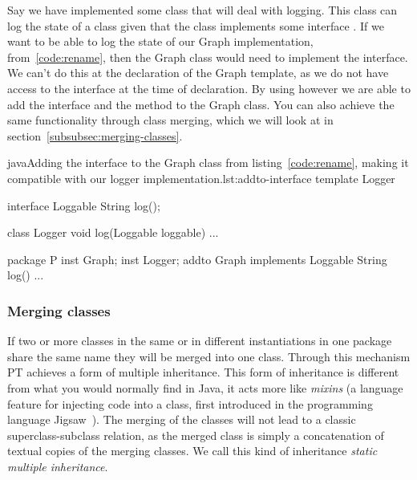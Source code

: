 Say we have implemented some class that will deal with logging.
This class can log the state of a class given that the class implements some interface .
If we want to be able to log the state of our Graph implementation, from~\vref{code:rename}, then the Graph class would need to implement the  interface.
We can't do this at the declaration of the Graph template, as we do not have access to the interface at the time of declaration.
By using  however we are able to add the  interface and the  method to the Graph class.
You can also achieve the same functionality through class merging, which we will look at in section~\vref{subsubsec:merging-classes}.

\begin{code}{java}{Adding the  interface to the Graph class from listing~\vref{code:rename}, making it compatible with our logger implementation.}{lst:addto-interface}
    template Logger {
        interface Loggable {
            String log();
        }

        class Logger {
            void log(Loggable loggable) {
                ...
            }
        }
    }

    package P {
        inst Graph;
        inst Logger;
        addto Graph implements Loggable {
            String log() {
                ...
            }
        }
    }
\end{code}



\subsubsection{Merging classes}\label{subsubsec:merging-classes}

If two or more classes in the same or in different instantiations in one package share the same name they will be merged into one class.
Through this mechanism PT achieves a form of multiple inheritance.
This form of inheritance is different from what you would normally find in Java, it acts more like \textit{mixins} (a language feature for injecting code into a class, first introduced in the programming language Jigsaw~\cite{jigsaw}).
The merging of the classes will not lead to a classic superclass-subclass relation, as the merged class is simply a concatenation of textual copies of the merging classes.
We call this kind of inheritance \textit{static multiple inheritance}.

